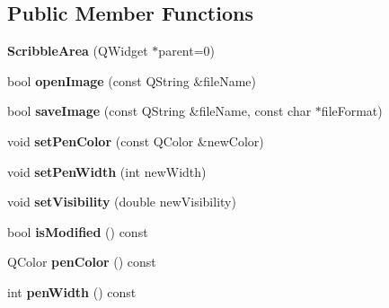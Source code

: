 \subsection*{\-Public \-Member \-Functions}
\begin{DoxyCompactItemize}
\item 
\hypertarget{classScribbleArea_a3560f2a44b46531591a1f4b1e42ea86f}{{\bfseries \-Scribble\-Area} (\-Q\-Widget $\ast$parent=0)}\label{classScribbleArea_a3560f2a44b46531591a1f4b1e42ea86f}

\item 
\hypertarget{classScribbleArea_afdce32fa1f5d3220987d4983e8a43e1e}{bool {\bfseries open\-Image} (const \-Q\-String \&file\-Name)}\label{classScribbleArea_afdce32fa1f5d3220987d4983e8a43e1e}

\item 
\hypertarget{classScribbleArea_a9496b9970942db6abfea836e6bf56ee4}{bool {\bfseries save\-Image} (const \-Q\-String \&file\-Name, const char $\ast$file\-Format)}\label{classScribbleArea_a9496b9970942db6abfea836e6bf56ee4}

\item 
\hypertarget{classScribbleArea_a7ad908197d1fba9479da2b88d898ed42}{void {\bfseries set\-Pen\-Color} (const \-Q\-Color \&new\-Color)}\label{classScribbleArea_a7ad908197d1fba9479da2b88d898ed42}

\item 
\hypertarget{classScribbleArea_a3d9093f87987c3123744605a7a2cf15e}{void {\bfseries set\-Pen\-Width} (int new\-Width)}\label{classScribbleArea_a3d9093f87987c3123744605a7a2cf15e}

\item 
\hypertarget{classScribbleArea_a99eae1d7be108e4cde817f0ec395c8ed}{void {\bfseries set\-Visibility} (double new\-Visibility)}\label{classScribbleArea_a99eae1d7be108e4cde817f0ec395c8ed}

\item 
\hypertarget{classScribbleArea_a39eccfe97fab1b788cc873d5de7fce46}{bool {\bfseries is\-Modified} () const }\label{classScribbleArea_a39eccfe97fab1b788cc873d5de7fce46}

\item 
\hypertarget{classScribbleArea_a1de2530671bd6d575a1499892e877990}{\-Q\-Color {\bfseries pen\-Color} () const }\label{classScribbleArea_a1de2530671bd6d575a1499892e877990}

\item 
\hypertarget{classScribbleArea_a2d1b263e57b70bf645934a1ac2f4e29f}{int {\bfseries pen\-Width} () const }\label{classScribbleArea_a2d1b263e57b70bf645934a1ac2f4e29f}


\end{DoxyCompactItemize}
